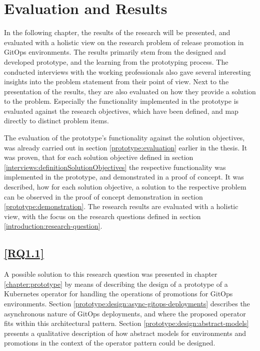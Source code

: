 \chapter{Evaluation and Results}
\label{evaluation-and-results}


In the following chapter,
the results of the research will be presented,
and evaluated with a holistic view on the research problem of release promotion in GitOps environments.
The results primarily stem from the designed and developed prototype,
and the learning from the prototyping process.
The conducted interviews with the working professionals also gave several interesting insights into
the problem statement from their point of view.
Next to the presentation of the results, they are also evaluated on how they provide a solution
to the problem.
Especially the functionality implemented in the prototype is evaluated against the research objectives,
which have been defined, and map directly to distinct problem items.

The evaluation of the prototype's functionality against the solution objectives,
was already carried out in section \ref{prototype:evaluation} earlier in the thesis.
It was proven, that for each solution objective defined in section \ref{interviews:definitionSolutionObjectives}
the respective functionality was implemented in the prototype,
and demonstrated in a proof of concept.
It was described, how for each solution objective,
a solution to the respective problem can be observed in the
proof of concept demonstration in section \ref{prototype:demonstration}.
The research results are evaluated with a holistic view,
with the focus on the research questions defined in section \ref{introduction:research-question}.

\section*{\ref{RQ1.1}}

A possible solution to this research question was presented in chapter
\ref{chapter:prototype}
by means of describing the design of a prototype
of a Kubernetes operator for handling the operations of promotions for GitOps environments.
%
Section \ref{prototype:design:async-gitops-deployments} describes the asynchronous nature of
GitOps deployments, and where the proposed operator fits within this architectural pattern.
%
Section \ref{prototype:design:abstract-models} presents a qualitative description 
of how abstract models for environments and promotions in the context of the operator pattern
could be designed.

